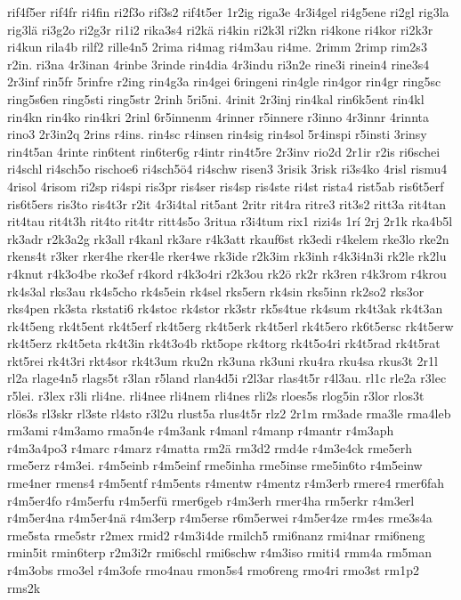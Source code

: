 {rif4f5er
rif4fr
ri4fin
ri2f3o
rif3s2
rif4t5er
1r2ig
riga3e
4r3i4gel
ri4g5ene
ri2gl
rig3la
rig3lä
ri3g2o
ri2g3r
ri1i2
rika3s4
ri2kä
ri4kin
ri2k3l
ri2kn
ri4kone
ri4kor
ri2k3r
ri4kun
rila4b
rilf2
rille4n5
2rima
ri4mag
ri4m3au
ri4me.
2rimm
2rimp
rim2s3
r2in.
ri3na
4r3inan
4rinbe
3rinde
rin4dia
4r3indu
ri3n2e
rine3i
rinein4
rine3s4
2r3inf
rin5fr
5rinfre
r2ing
rin4g3a
rin4gei
6ringeni
rin4gle
rin4gor
rin4gr
ring5sc
ring5s6en
ring5sti
ring5str
2rinh
5ri5ni.
4rinit
2r3inj
rin4kal
rin6k5ent
rin4kl
rin4kn
rin4ko
rin4kri
2rinl
6r5innenm
4rinner
r5innere
r3inno
4r3innr
4rinnta
rino3
2r3in2q
2rins
r4ins.
rin4sc
r4insen
rin4sig
rin4sol
5r4inspi
r5insti
3rinsy
rin4t5an
4rinte
rin6tent
rin6ter6g
r4intr
rin4t5re
2r3inv
rio2d
2r1ir
r2is
ri6schei
ri4schl
ri4sch5o
rischoe6
ri4sch5ö4
ri4schw
risen3
3risik
3risk
ri3s4ko
4risl
rismu4
4risol
4risom
ri2sp
ri4spi
ris3pr
ris4ser
ris4sp
ris4ste
ri4st
rista4
rist5ab
ris6t5erf
ris6t5ers
ris3to
ris4t3r
r2it
4r3i4tal
rit5ant
2ritr
rit4ra
ritre3
rit3s2
ritt3a
rit4tan
rit4tau
rit4t3h
rit4to
rit4tr
ritt4s5o
3ritua
r3i4tum
rix1
rizi4s
1rí
2rj
2r1k
rka4b5l
rk3adr
r2k3a2g
rk3all
r4kanl
rk3are
r4k3att
rkauf6st
rk3edi
r4kelem
rke3lo
rke2n
rkens4t
r3ker
rker4he
rker4le
rker4we
rk3ide
r2k3im
rk3inh
r4k3i4n3i
rk2le
rk2lu
r4knut
r4k3o4be
rko3ef
r4kord
r4k3o4ri
r2k3ou
rk2ö
rk2r
rk3ren
r4k3rom
r4krou
rk4s3al
rks3au
rk4s5cho
rk4s5ein
rk4sel
rks5ern
rk4sin
rks5inn
rk2so2
rks3or
rks4pen
rk3sta
rkstati6
rk4stoc
rk4stor
rk3str
rk5s4tue
rk4sum
rk4t3ak
rk4t3an
rk4t5eng
rk4t5ent
rk4t5erf
rk4t5erg
rk4t5erk
rk4t5erl
rk4t5ero
rk6t5ersc
rk4t5erw
rk4t5erz
rk4t5eta
rk4t3in
rk4t3o4b
rkt5ope
rk4torg
rk4t5o4ri
rk4t5rad
rk4t5rat
rkt5rei
rk4t3ri
rkt4sor
rk4t3um
rku2n
rk3una
rk3uni
rku4ra
rku4sa
rkus3t
2r1l
rl2a
rlage4n5
rlags5t
r3lan
r5land
rlan4d5i
r2l3ar
rlas4t5r
r4l3au.
rl1c
rle2a
r3lec
r5lei.
r3lex
r3li
rli4ne.
rli4nee
rli4nem
rli4nes
rli2s
rloes5s
rlog5in
r3lor
rlos3t
rlös3s
rl3skr
rl3ste
rl4sto
r3l2u
rlust5a
rlus4t5r
rlz2
2r1m
rm3ade
rma3le
rma4leb
rm3ami
r4m3amo
rma5n4e
r4m3ank
r4manl
r4manp
r4mantr
r4m3aph
r4m3a4po3
r4marc
r4marz
r4matta
rm2ä
rm3d2
rmd4e
r4m3e4ck
rme5erh
rme5erz
r4m3ei.
r4m5einb
r4m5einf
rme5inha
rme5inse
rme5in6to
r4m5einw
rme4ner
rmens4
r4m5entf
r4m5ents
r4mentw
r4mentz
r4m3erb
rmere4
rmer6fah
r4m5er4fo
r4m5erfu
r4m5erfü
rmer6geb
r4m3erh
rmer4ha
rm5erkr
r4m3erl
r4m5er4na
r4m5er4nä
r4m3erp
r4m5erse
r6m5erwei
r4m5er4ze
rm4es
rme3s4a
rme5sta
rme5str
r2mex
rmid2
r4m3i4de
rmilch5
rmi6nanz
rmi4nar
rmi6neng
rmin5it
rmin6terp
r2m3i2r
rmi6schl
rmi6schw
r4m3iso
rmiti4
rmm4a
rm5man
r4m3obs
rmo3el
r4m3ofe
rmo4nau
rmon5s4
rmo6reng
rmo4ri
rmo3st
rm1p2
rms2k
}
